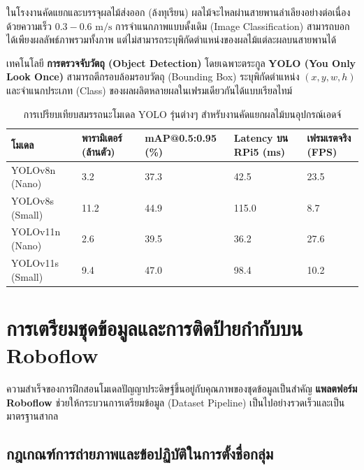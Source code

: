 ในโรงงานคัดแยกและบรรจุผลไม้ส่งออก (ล้งทุเรียน) ผลไม้จะไหลผ่านสายพานลำเลียงอย่างต่อเนื่องด้วยความเร็ว $0.3 - 0.6\text{ m/s}$ การจำแนกภาพแบบดั้งเดิม (Image Classification) สามารถบอกได้เพียงผลลัพธ์ภาพรวมทั้งภาพ แต่ไม่สามารถระบุพิกัดตำแหน่งของผลไม้แต่ละผลบนสายพานได้

เทคโนโลยี \textbf{การตรวจจับวัตถุ (Object Detection)} โดยเฉพาะตระกูล \textbf{YOLO (You Only Look Once)} สามารถตีกรอบล้อมรอบวัตถุ (Bounding Box) ระบุพิกัดตำแหน่ง $(x, y, w, h)$ และจำแนกประเภท (Class) ของผลผลิตหลายผลในเฟรมเดียวกันได้แบบเรียลไทม์

\begin{table}[H]
\centering
\caption{การเปรียบเทียบสมรรถนะโมเดล YOLO รุ่นต่างๆ สำหรับงานคัดแยกผลไม้บนอุปกรณ์เอดจ์}
\label{tab:yolo_comparison}
\begin{tabularx}{\textwidth}{p{3.2cm}YYYY}
    \toprule
    \textbf{โมเดล} & \textbf{พารามิเตอร์ (ล้านตัว)} & \textbf{mAP@0.5:0.95 (\%)} & \textbf{Latency บน RPi5 (ms)} & \textbf{เฟรมเรตจริง (FPS)} \\
    \midrule
    YOLOv8n (Nano) & 3.2 & 37.3 & 42.5 & 23.5 \\
    YOLOv8s (Small) & 11.2 & 44.9 & 115.0 & 8.7 \\
    YOLOv11n (Nano) & 2.6 & 39.5 & 36.2 & 27.6 \\
    YOLOv11s (Small) & 9.4 & 47.0 & 98.4 & 10.2 \\
    \bottomrule
\end{tabularx}
\end{table}

\section{การเตรียมชุดข้อมูลและการติดป้ายกำกับบน Roboflow}

ความสำเร็จของการฝึกสอนโมเดลปัญญาประดิษฐ์ขึ้นอยู่กับคุณภาพของชุดข้อมูลเป็นสำคัญ \textbf{แพลตฟอร์ม Roboflow} ช่วยให้กระบวนการเตรียมข้อมูล (Dataset Pipeline) เป็นไปอย่างรวดเร็วและเป็นมาตรฐานสากล

\subsection{กฎเกณฑ์การถ่ายภาพและข้อปฏิบัติในการตั้งชื่อกลุ่ม}

